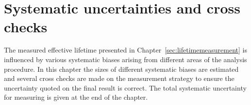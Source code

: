 \chapter{{\bf Systematic uncertainties and cross checks}}
\label{sec:systematics}
The measured \bsmumu effective lifetime presented in Chapter~\ref{sec:lifetimemeasurement} is influenced by various systematic biases arising from different areas of the analysis procedure. In this chapter the sizes of different systematic biases are estimated and several cross checks are made on the measurement strategy to ensure the uncertainty quoted on the final result is correct. The total systematic uncertainty for measuring \tmumu is given at the end of the chapter.


